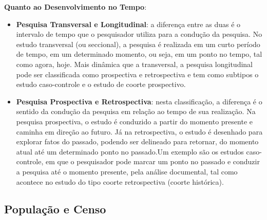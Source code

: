 \textbf{Quanto ao Desenvolvimento no Tempo}: 

\begin{itemize}
\item \textbf{Pesquisa Transversal e Longitudinal}: a diferença entre as duas é o intervalo de tempo que o pesquisador utiliza para a condução da pesquisa. No estudo transversal (ou seccional), a pesquisa é realizada em um curto período de tempo, em um determinado momento, ou seja, em um ponto no tempo, tal como agora, hoje. Mais dinâmica que a transversal, a pesquisa longitudinal pode ser classificada como prospectiva e retrospectiva e tem como subtipos o estudo caso-controle e o estudo de coorte prospectivo. 
\item \textbf{Pesquisa Prospectiva e Retrospectiva}: nesta classificação, a diferença é o sentido da condução da pesquisa em relação ao tempo de sua realização. Na pesquisa prospectiva, o estudo é conduzido a partir do momento presente e caminha em direção ao futuro. Já na retrospectiva, o estudo é desenhado para explorar fatos do passado, podendo ser delineado para retornar, do momento atual até um determinado ponto no passado.Um exemplo são os estudos caso-controle, em que o pesquisador pode marcar um ponto no passado e conduzir a pesquisa até o momento presente, pela  análise documental, tal como acontece no estudo do tipo coorte retrospectiva (coorte histórica). 
\end{itemize}



\subsection{População e Censo}

